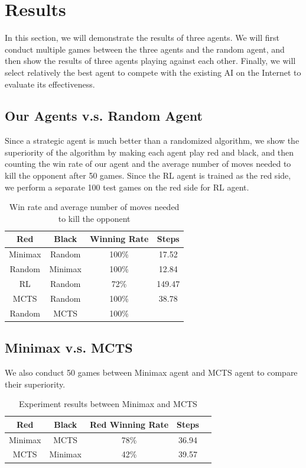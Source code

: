 \documentclass[letterpaper]{article}
\begin{document}
\section{Results}\label{sec:results}
In this section, we will demonstrate the results of three agents.
We will first conduct multiple games between the three agents and the random agent, and then show the results of three agents playing against each other.
Finally, we will select relatively the best agent to compete with the existing AI on the Internet to evaluate its effectiveness.

\subsection{Our Agents v.s. Random Agent}
\label{subsec:our-agents-vs-random-agent}
Since a strategic agent is much better than a randomized algorithm, we show the superiority of the algorithm by making each agent play red and black, and then counting the win rate of our agent and the average number of moves needed to kill the opponent after 50 games.
Since the RL agent is trained as the red side, we perform a separate 100 test games on the red side for RL agent.
\begin{table}[htbp]
    \centering
    \caption{Win rate and average number of moves needed to kill the opponent}
    \label{tab:tab1}
    \begin{tabular}{|c|c|c|c|}
        \hline
        Red & Black & Winning Rate & Steps  \\ \hline
        Minimax & Random & 100\% & 17.52 \\ \hline
        Random & Minimax & 100\% & 12.84 \\ \hline
        RL & Random & 72\% & 149.47 \\ \hline
        MCTS & Random & 100\% & 38.78\\ \hline
        Random & MCTS & 100\% & \\ \hline
    \end{tabular}
\end{table}

\subsection{Minimax v.s. MCTS}
\label{subsec:minimax-v.s.-mcts}
We also conduct 50 games between Minimax agent and MCTS agent to compare their superiority.
\begin{table}[htbp]
    \centering
    \caption{Experiment results between Minimax and MCTS}
    \label{tab:tab2}
    \begin{tabular}{|c|c|c|c|c|}
        \hline
        Red & Black & Red Winning Rate & Steps  \\ \hline
        Minimax & MCTS & 78\% & 36.94 \\ \hline
        MCTS & Minimax & 42\% & 39.57 \\ \hline
    \end{tabular}
\end{table}
\end{document}
